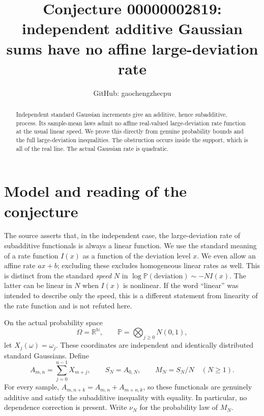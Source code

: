 \documentclass[11pt]{article}
\title{Conjecture 00000002819: independent additive Gaussian sums have no affine large-deviation rate}
\author{GitHub: gaochengzhecpu}
\date{}
\begin{document}
\maketitle
\begin{abstract}
Independent standard Gaussian increments give an additive, hence
subadditive, process. Its sample-mean laws admit no affine real-valued
large-deviation rate function at the usual linear speed. We prove this
directly from genuine probability bounds and the full large-deviation
inequalities. The obstruction occurs inside the support, which is all
of the real line. The actual Gaussian rate is quadratic.
\end{abstract}

\section*{Model and reading of the conjecture}
The source asserts that, in the independent case, the large-deviation
rate of subadditive functionals is always a linear function. We use
the standard meaning of a rate function $I(x)$ as a function of the
deviation level $x$. We even allow an affine rate $ax+b$; excluding
these excludes homogeneous linear rates as well. This is distinct from
the standard \emph{speed} $N$ in $\log\mathbb P(\text{deviation})
\sim-NI(x)$. The latter can be linear in $N$ when $I(x)$ is nonlinear.
If the word ``linear'' was intended to describe only the speed, this
is a different statement from linearity of the rate function and is
not refuted here.

On the actual probability space
\[
 \Omega=\mathbb R^{\mathbb N},\qquad
 \mathbb P=\bigotimes_{j\geq0} N(0,1),
\]
let $X_j(\omega)=\omega_j$. These coordinates are independent and
identically distributed standard Gaussians. Define
\[
 A_{m,n}=\sum_{j=0}^{n-1}X_{m+j},\qquad
 S_N=A_{0,N},\qquad M_N=S_N/N\quad(N\geq1).
\]
For every sample, $A_{m,n+k}=A_{m,n}+A_{m+n,k}$, so these functionals
are genuinely additive and satisfy the subadditive inequality with
equality. In particular, no dependence correction is present.
Write $\nu_N$ for the probability law of $M_N$.
\end{document}
